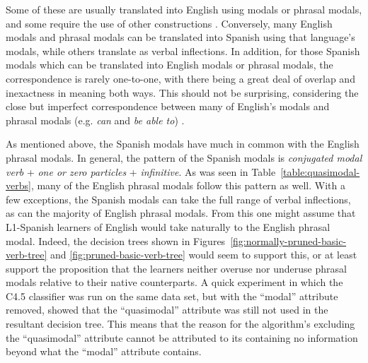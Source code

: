 \documentclass[main.tex]{subfiles}
\begin{document}
Some of these are usually translated into English using modals or phrasal modals, and some require the use of other constructions \citep[pp. 325-32]{butt}. Conversely, many English modals and phrasal modals can be translated into Spanish using that language's modals, while others translate as verbal inflections. In addition, for those Spanish modals which can be translated into English modals or phrasal modals, the correspondence is rarely one-to-one, with there being a great deal of overlap and inexactness in meaning both ways. This should not be surprising, considering the close but imperfect correspondence between many of English's modals and phrasal modals (e.g. \textit{can} and \textit{be able to}) \citep[pp. 137-157]{celce-murcia:1999}.

As mentioned above, the Spanish modals have much in common with the English phrasal modals. In general, the pattern of the Spanish modals is \textit{conjugated modal verb} + \textit{one or zero particles} + \textit{infinitive}. As was seen in Table~\ref{table:quasimodal-verbs}, many of the English phrasal modals follow this pattern as well. With a few exceptions, the Spanish modals can take the full range of verbal inflections, as can the majority of English phrasal modals. From this one might assume that L1-Spanish learners of English would take naturally to the English phrasal modal. Indeed, the decision trees shown in Figures~\ref{fig:normally-pruned-basic-verb-tree} and \ref{fig:pruned-basic-verb-tree} would seem to support this, or at least support the proposition that the learners neither overuse nor underuse phrasal modals relative to their native counterparts. A quick experiment in which the C4.5 classifier was run on the same data set, but with the ``modal'' attribute removed, showed that the ``quasimodal'' attribute was still not used in the resultant decision tree. This means that the reason for the algorithm's excluding the ``quasimodal'' attribute cannot be attributed to its containing no information beyond what the ``modal'' attribute contains.
\end{document}
